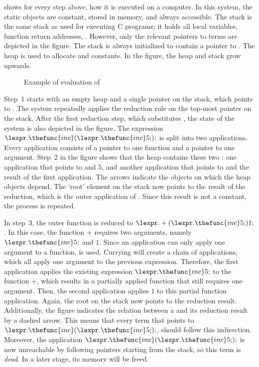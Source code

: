  shows for every step above, how it is executed on a computer.
In this system, the static objects are constant, stored in memory, and always accessible.
The stack is the same stack as used for executing C programs; it holds all local variables, function return addresses, \etc.
However, only the relevant pointers to terms are depicted in the figure.
The stack is always initialized to contain a pointer to .
The heap is used to allocate \lterms and constants.
In the figure, the heap and stack grow upwards.

\begin{figure}%
%
\caption{Example of evaluation of \ourfp}%
\label{fig:concurrency:evaluation}%
\end{figure}

Step~1 starts with an empty heap and a single pointer on the stack, which points to .
The system repeatedly applies the reduction rule on the top-most pointer on the stack.
After the first reduction step, which substitutes , the state of the system is also depicted in the figure.
The expression $\lexpr.\thefunc{inc} ({\lexpr.\thefunc{inc} 5;});$ is split into two applications.
Every application consists of a pointer to one function and a pointer to one argument.
Step~2 in the figure shows that the heap contains these two \lterms: one application that points to  and $5$, and another application that points to  and the result of the first application.
The arrows indicate the objects on which the heap objects depend.
The `root' element on the stack now points to the result of the reduction, which is the outer application of .
Since this result is not a constant, the process is repeated.

In step~3, the outer  function is reduced to $\lexpr.+ ({\lexpr.\thefunc{inc} 5;}) 1;$.
In this case, the function $+$ requires two arguments, namely $\lexpr.\thefunc{inc} 5;$ and $1$.
Since an application can only apply one argument to a function, \emph{} is used.
Currying will create a chain of applications, which all apply one argument to the previous expression.
Therefore, the first application applies the existing expression $\lexpr.\thefunc{inc} 5;$ to the function $+$, which results in a partially applied function that still requires one argument.
Then, the second application applies $1$ to this partial function application.
Again, the root on the stack now points to the reduction result.
Additionally, the figure indicates the relation between a \lterm and its reduction result by a dashed arrow.
This means that every term that points to $\lexpr.\thefunc{inc} ({\lexpr.\thefunc{inc} 5;});$, should follow this indirection.
Moreover, the application $\lexpr.\thefunc{inc} ({\lexpr.\thefunc{inc} 5;});$ is now unreachable by following pointers starting from the stack, so this term is \emph{dead}.
In a later stage, its memory will be freed.

